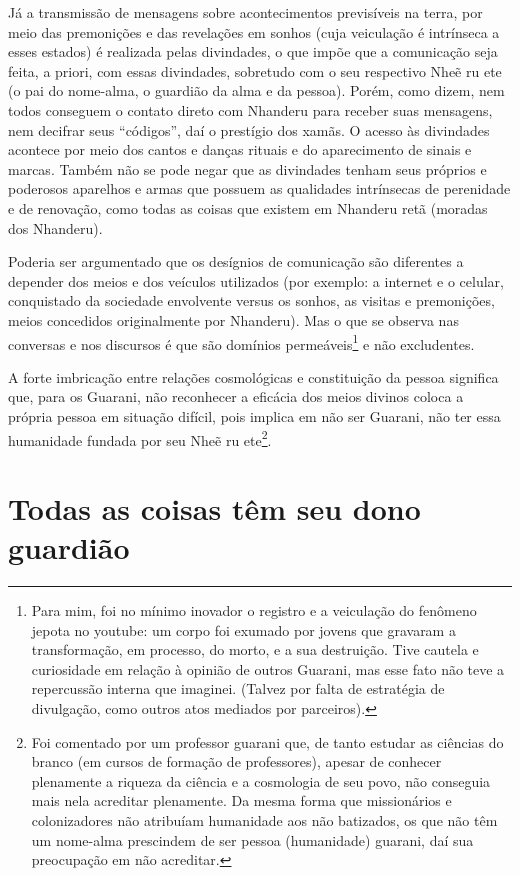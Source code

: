 Já a transmissão de mensagens sobre acontecimentos previsíveis na terra,
por meio das premonições e das revelações em sonhos (cuja veiculação é
intrínseca a esses estados) é realizada pelas divindades, o que impõe
que a comunicação seja feita, a priori, com essas divindades, sobretudo
com o seu respectivo Nheẽ ru ete (o pai do nome-alma, o guardião
da alma e da pessoa). Porém, como dizem, nem todos conseguem o contato
direto com Nhanderu para receber suas mensagens, nem decifrar seus
``códigos'', daí o prestígio dos xamãs. O acesso às divindades acontece
por meio dos cantos e danças rituais e do aparecimento de sinais e
marcas. Também não se pode negar que as divindades tenham seus próprios
e poderosos aparelhos e armas que possuem as qualidades intrínsecas de
perenidade e de renovação, como todas as coisas que existem em Nhanderu
retã (moradas dos Nhanderu). 

Poderia ser argumentado que os desígnios de comunicação são diferentes a
depender dos meios e dos veículos utilizados (por exemplo: a internet e
o celular, conquistado da sociedade envolvente versus os sonhos, as
visitas e premonições, meios concedidos originalmente por Nhanderu).
Mas o que se observa nas conversas e nos discursos é que são domínios
permeáveis\footnote{Para mim, foi no mínimo inovador o registro e a
veiculação do fenômeno  jepota no youtube: um corpo foi exumado por
jovens que gravaram a transformação, em processo, do morto, e a sua
destruição. Tive cautela e curiosidade em relação à opinião de outros
Guarani, mas esse fato não teve a repercussão interna que imaginei.
(Talvez por falta de estratégia de divulgação, como outros atos
mediados por parceiros).} e não excludentes.

A forte imbricação entre relações cosmológicas e constituição da pessoa
significa que, para os Guarani, não reconhecer a eficácia dos meios
divinos coloca a própria pessoa em situação difícil, pois implica em
não ser Guarani, não ter essa humanidade fundada por seu  Nheẽ ru
ete\footnote{Foi comentado por um professor guarani que, de tanto
estudar as ciências do branco (em cursos de formação de professores),
apesar de conhecer plenamente a riqueza da ciência e a cosmologia de
seu povo, não conseguia mais nela acreditar plenamente. Da mesma forma
que missionários e colonizadores não atribuíam humanidade aos não
batizados, os que não têm um nome-alma prescindem de ser pessoa
(humanidade) guarani, daí sua preocupação em não acreditar.}.  

\section{Todas as coisas têm seu dono guardião}

